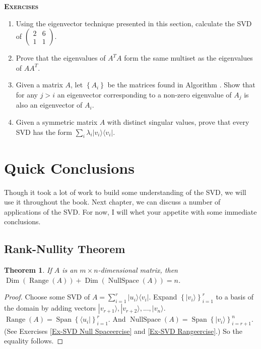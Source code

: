 \documentclass{amsbook}
\newtheorem{theorem}{Theorem}
\begin{document}
{\bfseries\scshape\Large Exercises}

\begin{enumerate}
\item Using the eigenvector technique presented in this section, calculate the SVD of $\left(\begin{array}{cc}2&6\\1&1\end{array}\right)$.
\item Prove that the eigenvalues of $A^TA$ form the same multiset as the eigenvalues of $AA^T$.
\item Given a matrix $A$, let $\left\{A_i\right\}$ be the matrices found in Algorithm \label{alg1}.  Show that for any $j>i$ an eigenvector corresponding to a non-zero eigenvalue of $A_j$ is also an eigenvector of $A_i$.
\item Given a symmetric matrix $A$ with distinct singular values, prove that every SVD has the form $\sum_i\lambda_i|v_i\rangle\langle v_i|$.
\end{enumerate}

\section{Quick Conclusions}\label{Quick Conclusions}

Though it took a lot of work to build some understanding of the SVD, we will use it throughout the book.  Next chapter, we can discuss a number of applications of the SVD.  For now, I will whet your appetite with some immediate conclusions.

\subsection{Rank-Nullity Theorem}

 \begin{theorem}
If $A$ is an $m\times n$-dimensional matrix, then $\operatorname{Dim}\left(\operatorname{Range}(A)\right)+\operatorname{Dim}\left(\operatorname{NullSpace}(A)\right)=n$.
 \end{theorem}

\begin{proof}
Choose some SVD of $A=\sum_{i=1}^r|u_i\rangle\langle v_i|$.  Expand $\left\{|v_i\rangle\right\}_{i=1}^r$ to a basis of the domain by adding vectors $|v_{r+1}\rangle, |v_{r+2}\rangle, ..., |v_n\rangle$.  $\operatorname{Range}(A)=\operatorname{Span}\left\{\langle u_i|\right\}_{i=1}^r$.  And $\operatorname{NullSpace}(A)=\operatorname{Span}\left\{|v_i\rangle\right\}_{i=r+1}^n$.  (See Exercises \ref{Ex-SVD Null Spaceercise} and \ref{Ex-SVD Rangeercise}.)  So the equality follows.
\end{proof}
\end{document}
